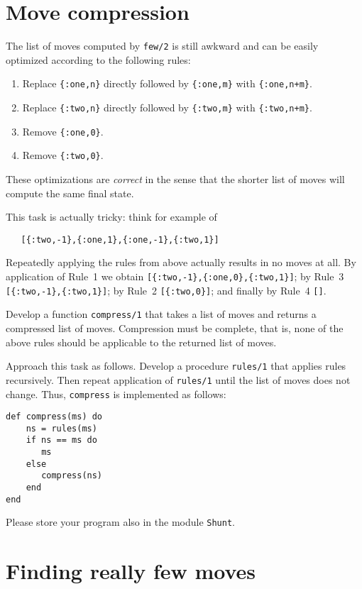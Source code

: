 \documentclass[a4paper,11pt]{article}
\begin{document}
\section{Move compression}

The list of moves computed by \verb+few/2+ is still awkward and
can be easily optimized according to the following rules:
\begin{enumerate}
\item Replace \verb+{:one,n}+ directly followed by \verb+{:one,m}+ with
  \verb-{:one,n+m}-.
\item Replace \verb+{:two,n}+ directly followed by \verb+{:two,m}+ with
  \verb-{:two,n+m}-.
\item Remove \verb+{:one,0}+.
\item Remove \verb+{:two,0}+.
\end{enumerate}

These optimizations are \emph{correct} in the sense that the
shorter list of moves will compute the same final state.

This task is actually tricky: think for example of 
\begin{verbatim}
   [{:two,-1},{:one,1},{:one,-1},{:two,1}]
\end{verbatim}
Repeatedly applying the rules from above actually results in no
moves at all. By application of Rule~1 we obtain
\verb+[{:two,-1},{:one,0},{:two,1}]+;
by Rule~3 
\verb+[{:two,-1},{:two,1}]+;
by Rule~2
\verb+[{:two,0}]+;
and finally by Rule~4
\verb+[]+.

Develop a function \verb+compress/1+ that takes a list of moves and
returns a compressed list of moves. Compression must be complete,
that is, none of the above rules should be applicable to the
returned list of moves.

Approach this task as follows. Develop a procedure
\verb+rules/1+ that applies rules recursively. Then repeat
application of \verb+rules/1+ until the list of moves does not
change. Thus, \verb+compress+ is implemented as follows:
\begin{verbatim}
def compress(ms) do
    ns = rules(ms)
    if ns == ms do 
       ms
    else
       compress(ns)
    end
end
\end{verbatim}

Please store your program also in the module \verb+Shunt+.

\section{Finding really few moves}
\end{document}
